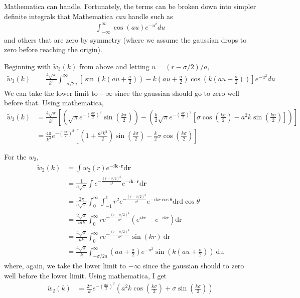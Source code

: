 \documentclass[letterpaper,twocolumn,amsmath,amssymb,prb]{revtex4-1}
\newcommand{\rr}{\textbf{r}}
\begin{document}
Mathematica can handle.  Fortunately, the terms can be broken down
into simpler definite integrals that Mathematica \emph{can} handle
such as
\begin{align}
  \int_{-\infty}^\infty \cos(a u)e^{-u^2}du
\end{align}
and others that are zero by symmetry (where we assume the gaussian
drops to zero before reaching the origin).
\begin{widetext}
Beginning with $\tilde{w}_3(k)$ from above and letting $u = (r-\sigma/2)/a,$
  \begin{align}
    \tilde{w}_3(k)
    &=  \frac{4\sqrt{\pi}}{k^3}\int_{-\sigma/2a}^\infty \left[ \sin(k(au+\frac{\sigma}{2}))
      - k(au + \frac{\sigma}{2}) \cos(k(au+\frac{\sigma}{2}))\right] e^{-u^2} du
  \end{align}
We can take the lower limit to $-\infty$ since the gaussian should go
to zero well before that. Using mathematica,
  \begin{align}
    \tilde{w}_3(k) &= \frac{4\sqrt{\pi}}{k^3}
    \left[ \left(\sqrt{\pi}e^{-\left(\frac{ak}{2}\right)^2}
    \sin\left(\frac{k\sigma}{2}\right) \right) - \left( \frac{k}{2}
    \sqrt{\pi}e^{-\left(\frac{ak}{2}\right)^2} \left[\sigma
      \cos\left(\frac{k \sigma}{2}\right) - a^2 k \sin\left(\frac{k \sigma}{2}\right)
      \right] \right)\right] \\ 
    &= \frac{4\pi}{k^3}e^{-\left(\frac{ak}{2}\right)^2}\left[ \left(1 + \frac{a^2k^2}{2} \right)
      \sin\left(\frac{k\sigma}{2}\right) - \frac{k}{2} \sigma\cos\left(\frac{k \sigma}{2}\right)  \right]
  \end{align}
\end{widetext}

For the $w_2$,
\begin{align}
  \tilde{w}_2(k) &= \int w_2(r) e^{-i \mathbf{k} \cdot
    \rr} \textrm{d} \rr \\
  &= \frac{1}{a\sqrt{\pi}}\int e^{-\frac{(r-\sigma/2)^2}{a^2}} e^{-i \mathbf{k} \cdot
    \rr} \textrm{d} \rr \\
  &= \frac{2\pi}{a\sqrt{\pi}}\int_0^\infty \int_{-1}^1 r^2 e^{-\frac{(r-\sigma/2)^2}{a^2}}
  e^{-ikr\cos{\theta}} \textrm{drd}\cos{\theta} \\
  &= \frac{2\sqrt{\pi}}{iak} \int_0^\infty r e^{-\frac{(r-\sigma/2)^2}{a^2}}
  \left(e^{ikr} - e^{-ikr}\right) \textrm{dr} \\
  &= \frac{4\sqrt{\pi}}{ak} \int_0^\infty r e^{-\frac{(r-\sigma/2)^2}{a^2}}
  \sin(kr) ~\textrm{dr} \\
  &= \frac{4\sqrt{\pi}}{k} \int_{-\sigma/2a}^\infty \left(au +
  \frac{\sigma}{2}\right) e^{-u^2} \sin\left(k\left(au +
  \frac{\sigma}{2}\right)\right) ~\textrm{du}
\end{align}
where, again, we take the lower limit to $-\infty$ since the gaussian
should to zero well before the lower limit. Using mathematica, I get
\begin{align}
  \tilde{w}_2(k) &=\frac{2\pi}{k} e^{-\left(\frac{ak}{2} \right)^2} \left(a^2 k
  \cos\left(\frac{k\sigma}{2}\right) +\sigma \sin\left(\frac{k\sigma}{2}\right) \right)
\end{align}
\end{document}
